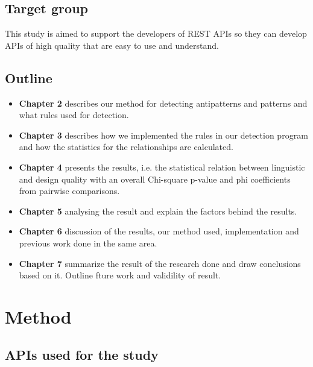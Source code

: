 \documentclass[a4paper,12pt]{article}
\begin{document}
\subsection{Target group}
This study is aimed to support the developers of REST APIs so they can develop APIs of high quality that are easy to use and understand. 

\subsection{Outline}

\begin{itemize}
\item \textbf{Chapter 2} describes our method for detecting antipatterns and patterns and what rules used for detection.
\item \textbf{Chapter 3} describes how we implemented the rules in our detection program and how the statistics for the relationships are calculated.
\item \textbf{Chapter 4} presents the results, i.e. the statistical relation between linguistic and design quality with an overall Chi-square p-value and phi coefficients from pairwise comparisons.
\item \textbf{Chapter 5} analysing the result and explain the factors behind the results.
\item \textbf{Chapter 6} discussion of the results, our method used, implementation and previous work done in the same area.
\item \textbf{Chapter 7} summarize the result of the research done and draw conclusions based on it. Outline fture work and validility of result.
\end{itemize}
\newpage

\section{Method}
\label{Method}
\subsection{APIs used for the study}
\end{document}
